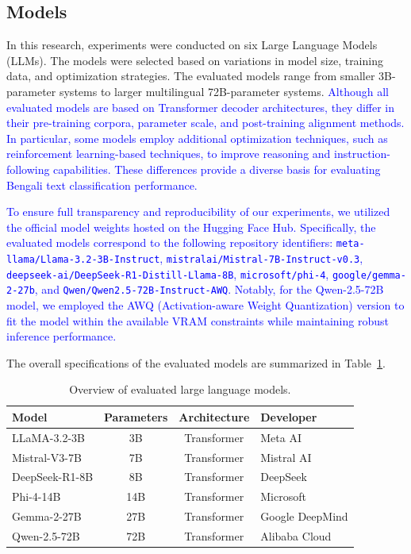 \documentclass[10pt,letterpaper]{article}
\newcommand{\rev}[1]{\textcolor{blue}{#1}}
\begin{document}
\subsection*{Models}
In this research, experiments were conducted on six Large Language Models (LLMs). 
The models were selected based on variations in model size, training data, and 
optimization strategies. The evaluated models range from smaller 3B-parameter 
systems to larger multilingual 72B-parameter systems. \rev{Although all evaluated 
models are based on Transformer decoder architectures, they differ in their 
pre-training corpora, parameter scale, and post-training alignment methods. 
In particular, some models employ additional optimization techniques, such as 
reinforcement learning-based techniques, to improve reasoning and 
instruction-following capabilities. These differences provide a diverse basis 
for evaluating Bengali text classification performance.}


\rev{To ensure full transparency and reproducibility of our experiments, we utilized the official model weights hosted on the Hugging Face Hub. Specifically, the evaluated models correspond to the following repository identifiers: \texttt{meta-llama/Llama-3.2-3B-Instruct}, \texttt{mistralai/Mistral-7B-Instruct-v0.3}, \texttt{deepseek-ai/DeepSeek-R1-Distill-Llama-8B}, \texttt{microsoft/phi-4}, \texttt{google/gemma-2-27b}, and \texttt{Qwen/Qwen2.5-72B-Instruct-AWQ}. Notably, for the Qwen-2.5-72B model, we employed the AWQ (Activation-aware Weight Quantization) version to fit the model within the available VRAM constraints while maintaining robust inference performance.}

The overall specifications of the evaluated models are summarized in Table~\ref{tab:models}.

\begin{table}[!t]
\centering
\small
\caption{Overview of evaluated large language models.}
\label{tab:models}
\renewcommand{\arraystretch}{1.2}
\setlength{\tabcolsep}{6pt}

\begin{tabularx}{\columnwidth}{|l|c|c|X|}
\hline
\textbf{Model} & \textbf{Parameters} & \textbf{Architecture} & \textbf{Developer} \\\hline
LLaMA-3.2-3B   & 3B  & Transformer        & Meta AI \\\hline
Mistral-V3-7B  & 7B  & Transformer        & Mistral AI \\\hline
DeepSeek-R1-8B & 8B  & Transformer        & DeepSeek \\\hline
Phi-4-14B      & 14B & Transformer        & Microsoft \\\hline
Gemma-2-27B    & 27B & Transformer        & Google DeepMind \\\hline
Qwen-2.5-72B   & 72B & Transformer        & Alibaba Cloud \\\hline
\end{tabularx}

\end{table}
\end{document}
